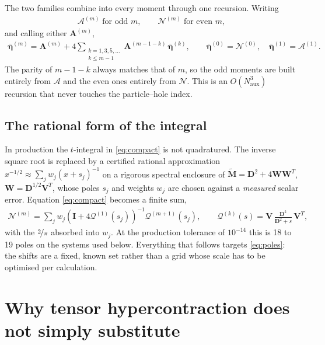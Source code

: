 \documentclass[11pt]{article}
\newcommand{\mat}[1]{{\mathbf{#1}}}
\newcommand{\parth}[1]{\left(#1\right)}
\newcommand{\Dcal}{\mathcal{A}}
\newcommand{\Qcal}{\mathcal{Q}}
\newcommand{\Ncal}{\mathcal{N}}
\begin{document}
The two families combine into every moment through one recursion. Writing
\begin{align}
    \Dcal^{(m)} \;\text{for odd } m, \qquad \Ncal^{(m)} \;\text{for even } m,
\end{align}
and calling either $\mat{A}^{(m)}$,
\begin{align}
    \bar{\bm\eta}^{(m)}
    = \mat{A}^{(m)} + 4 \!\!\sum_{\substack{k = 1,3,5,\dots \\ k \le m-1}}\!\!
      \mat{A}^{(m-1-k)}\, \bar{\bm\eta}^{(k)} ,
    \qquad \bar{\bm\eta}^{(0)} = \Ncal^{(0)} ,\quad \bar{\bm\eta}^{(1)} = \Dcal^{(1)} .
    \label{eq:recursion}
\end{align}
The parity of $m-1-k$ always matches that of $m$, so the odd moments are built entirely
from $\Dcal$ and the even ones entirely from $\Ncal$. This is an $O(N_{\text{aux}}^3)$
recursion that never touches the particle--hole index.

\subsection{The rational form of the integral}

In production the $t$-integral in \eqref{eq:compact} is not quadratured. The inverse square
root is replaced by a certified rational approximation
$x^{-1/2} \approx \sum_j w_j (x + s_j)^{-1}$ on a rigorous spectral enclosure of
$\tilde{\mat{M}} = \mat{D}^2 + 4\mat{W}\mat{W}^T$, $\mat{W} = \mat{D}^{1/2}\mat{V}^T$, whose
poles $s_j$ and weights $w_j$ are chosen against a \emph{measured} scalar error. Equation
\eqref{eq:compact} becomes a finite sum,
\begin{align}
    \Ncal^{(m)}
    = \sum_j w_j \parth{\mat{I} + 4\Qcal^{(1)}(s_j)}^{-1} \Qcal^{(m+1)}(s_j) ,
    \qquad
    \Qcal^{(k)}(s) = \mat{V}\, \frac{\mat{D}^{k}}{\mat{D}^2 + s}\, \mat{V}^T ,
    \label{eq:poles}
\end{align}
with the $\nicefrac{2}{\pi}$ absorbed into $w_j$. At the production tolerance of $10^{-14}$
this is 18 to 19 poles on the systems used below. Everything that follows targets
\eqref{eq:poles}: the shifts are a fixed, known set rather than a grid whose scale has to be
optimised per calculation.

\section{Why tensor hypercontraction does not simply substitute}
\end{document}
